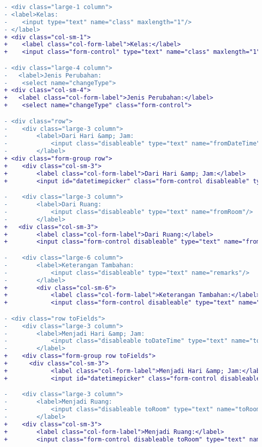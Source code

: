 \begin{lstlisting}[language=diff, caption=Kode untuk Halaman Perubahan Kuliah Request, label=Entri, basicstyle=\ttfamily, frame=single,
columns=fullflexible, keepspaces=true, breaklines=true]
- <div class="large-1 column">
- <label>Kelas:
-    <input type="text" name="class" maxlength="1"/>
- </label>
+ <div class="col-sm-1">
+    <label class="col-form-label">Kelas:</label>
+    <input class="form-control" type="text" name="class" maxlength="1"/>

- <div class="large-4 column">
-   <label>Jenis Perubahan:
-    <select name="changeType">
+ <div class="col-sm-4">
+   <label class="col-form-label">Jenis Perubahan:</label>
+    <select name="changeType" class="form-control">

- <div class="row">
-    <div class="large-3 column">
-        <label>Dari Hari &amp; Jam:
-            <input class="disableable" type="text" name="fromDateTime" id="fromDateTime"/>
-        </label>
+ <div class="form-group row">
+    <div class="col-sm-3">
+        <label class="col-form-label">Dari Hari &amp; Jam:</label>
+        <input id="datetimepicker" class="form-control disableable" type="text" name="fromDateTime">

-    <div class="large-3 column">
-        <label>Dari Ruang:
-            <input class="disableable" type="text" name="fromRoom"/>
-        </label>
+   <div class="col-sm-3">
+        <label class="col-form-label">Dari Ruang:</label>
+        <input class="form-control disableable" type="text" name="fromRoom"/>

-    <div class="large-6 column">
-        <label>Keterangan Tambahan:
-            <input class="disableable" type="text" name="remarks"/>
-        </label>
+        <div class="col-sm-6">
+            <label class="col-form-label">Keterangan Tambahan:</label>
+            <input class="form-control disableable" type="text" name="remarks"/>

- <div class="row toFields">
-    <div class="large-3 column">
-        <label>Menjadi Hari &amp; Jam:
-            <input class="disableable toDateTime" type="text" name="toDateTime[]"/>
-        </label>
+    <div class="form-group row toFields">
+      <div class="col-sm-3">
+            <label class="col-form-label">Menjadi Hari &amp; Jam:</label>
+            <input id="datetimepicker" class="form-control disableable toDateTime" type="text" name="toDateTime[]"/>

-    <div class="large-3 column">
-        <label>Menjadi Ruang:
-            <input class="disableable toRoom" type="text" name="toRoom[]"/>
-        </label>
+    <div class="col-sm-3">
+        <label class="col-form-label">Menjadi Ruang:</label>
+        <input class="form-control disableable toRoom" type="text" name="toRoom[]"/>


\end{lstlisting}
